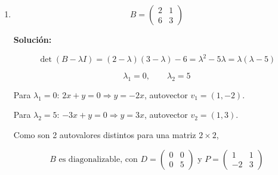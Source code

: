 \documentclass[12pt]{article}
\newcommand{\solucion}{%
    \vspace{0.8em}%
    \textbf{Solución:}%
    \vspace{0.8em}%
}
\begin{document}
\begin{enumerate}[label=\alph*.-]
    Del sistema se deduce que $x=y$, autovector $v_1=(1,1)$.

    Para $\lambda_2=2$:

    \[
    \begin{pmatrix}2&2\\2&2\end{pmatrix}\begin{pmatrix}x\\y\end{pmatrix}=\begin{pmatrix}0\\0\end{pmatrix}
    \ \Rightarrow\
    \begin{cases}2x+2y=0\\2x+2y=0\end{cases}
    \ \Rightarrow\ x=-y
    \]

    autovector $v_2=(1,-1)$.

    Luego es diagonalizable porque $\lambda$ tiene multiplicidad
    simple (los 2 autovalores son distintos para una matriz
    $2\times2$),

    \[
    \boxed{A \text{ es diagonalizable, con } D=\begin{pmatrix}6&0\\0&2\end{pmatrix}
    \text{ y } P=\begin{pmatrix}1&1\\1&-1\end{pmatrix}}
    \]

    \item
    \[
    B=\begin{pmatrix}2&1\\6&3\end{pmatrix}
    \]

    \solucion

    \[
    \det(B-\lambda I)=(2-\lambda)(3-\lambda)-6=\lambda^2-5\lambda
    =\lambda(\lambda-5)
    \]

    \[
    \boxed{\lambda_1=0,\qquad \lambda_2=5}
    \]

    Para $\lambda_1=0$: $2x+y=0\Rightarrow y=-2x$, autovector
    $v_1=(1,-2)$.

    Para $\lambda_2=5$: $-3x+y=0\Rightarrow y=3x$, autovector
    $v_2=(1,3)$.

    Como son 2 autovalores distintos para una matriz $2\times2$,

    \[
    \boxed{B \text{ es diagonalizable, con } D=\begin{pmatrix}0&0\\0&5\end{pmatrix}
    \text{ y } P=\begin{pmatrix}1&1\\-2&3\end{pmatrix}}
    \]


\end{enumerate}
\end{document}
